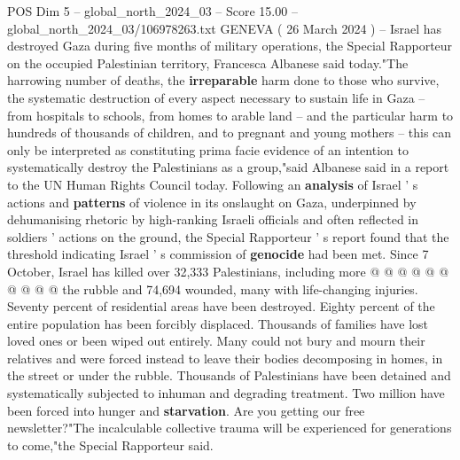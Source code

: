 \begin{textsample}{POS Dim 5 – global\_north\_2024\_03 – Score 15.00 – global\_north\_2024\_03/106978263.txt}  \label{ex:f5_pos_366}
GENEVA ( 26 March 2024 ) -- Israel has destroyed Gaza during five months of military operations, the Special Rapporteur on the occupied Palestinian territory, Francesca Albanese said today."The harrowing number of deaths, the \textbf{irreparable} harm done to those who survive, the systematic destruction of every aspect necessary to sustain life in Gaza -- from hospitals to schools, from homes to arable land -- and the particular harm to hundreds of thousands of children, and to pregnant and young mothers -- this can only be interpreted as constituting prima facie evidence of an intention to systematically destroy the Palestinians as a group,"said Albanese said in a report to the UN Human Rights Council today.
Following an \textbf{analysis} of Israel ' s actions and \textbf{patterns} of violence in its onslaught on Gaza, underpinned by dehumanising rhetoric by high-ranking Israeli officials and often reflected in soldiers ' actions on the ground, the Special Rapporteur ' s report found that the threshold indicating Israel ' s commission of \textbf{genocide} had been met.
Since 7 October, Israel has killed over 32,333 Palestinians, including more @ @ @ @ @ @ @ @ @ @ the rubble and 74,694 wounded, many with life-changing injuries.
Seventy percent of residential areas have been destroyed.
Eighty percent of the entire population has been forcibly displaced.
Thousands of families have lost loved ones or been wiped out entirely.
Many could not bury and mourn their relatives and were forced instead to leave their bodies decomposing in homes, in the street or under the rubble.
Thousands of Palestinians have been detained and systematically subjected to inhuman and degrading treatment.
Two million have been forced into hunger and \textbf{starvation}.
Are you getting our free newsletter?"The incalculable collective trauma will be experienced for generations to come,"the Special Rapporteur said.

\end{textsample}
